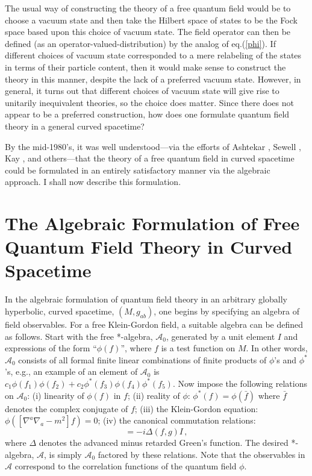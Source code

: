 The usual way of constructing the theory of a free quantum field would
be to choose a vacuum state and then take the Hilbert space of states
to be the Fock space based upon this choice of vacuum state. The field
operator can then be defined (as an operator-valued-distribution) by
the analog of eq.(\ref{phi}). If different choices of vacuum state
corresponded to a mere relabeling of the states in terms of their
particle content, then it would make sense to construct the theory in
this manner, despite the lack of a preferred vacuum state. However, in
general, it turns out that different choices of vacuum state will give
rise to unitarily inequivalent theories, so the choice does
matter. Since there does not appear to be a preferred construction,
how does one formulate quantum field theory in a general curved
spacetime?

By the mid-1980's, it was well understood---via the efforts of
Ashtekar \cite{a}, Sewell \cite{se}, Kay \cite{k}, and others---that
the theory of a free quantum field in curved spacetime could be
formulated in an entirely satisfactory manner via the algebraic
approach. I shall now describe this formulation.

\section{The Algebraic Formulation of Free Quantum Field Theory 
in Curved Spacetime}

In the algebraic formulation of quantum field theory in an arbitrary
globally hyperbolic, curved spacetime, $(M, g_{ab})$, one begins by
specifying an algebra of field observables. For a free Klein-Gordon
field, a suitable algebra can be defined as follows. Start with the
free *-algebra, ${\mathcal A}_0$, generated by a unit element $I$ and
expressions of the form ``$\phi(f)$'', 
where $f$ is a test function on $M$. In other words,
${\mathcal A}_0$ consists of all formal finite linear combinations of
finite products of $\phi$'s and $\phi^*$'s, e.g., an example of an
element of ${\mathcal A}_0$ is $c_1 \phi(f_1) \phi(f_2) + c_2 \phi^*
(f_3) \phi(f_4) \phi^*(f_5)$. Now impose the following relations on
${\mathcal A}_0$: (i) linearity of $\phi(f)$ in $f$; (ii) reality of
$\phi$: $\phi^*(f) = \phi(\bar{f})$ where $\bar{f}$ denotes the
complex conjugate of $f$; (iii) the Klein-Gordon equation:
$\phi([\nabla^a \nabla_a - m^2] f) = 0$; (iv) the canonical
commutation relations:
\begin{equation}
[\phi(f), \phi(g)] = - i \Delta(f,g) I \, ,
\end{equation}
where $\Delta$ denotes the advanced minus retarded Green's
function. The desired *-algebra, $\mathcal A$, is simply ${\mathcal
A}_0$ factored by these relations. Note that the observables in
${\mathcal A}$ correspond to the correlation functions of the quantum
field $\phi$.

